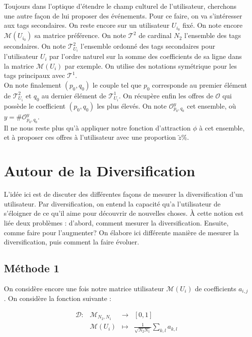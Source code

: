 \documentclass[11pt, oneside]{article}
\begin{document}
Toujours dans l'optique d'étendre le champ culturel de l'utilisateur, cherchons une autre façon de lui proposer des événements. Pour ce faire, on va s'intéresser aux tags secondaires. On reste encore sur un utilisateur $U_{i_0}$ fixé. On note encore $\mathcal{M} (U_{i_0})$ sa matrice préférence. On note $\mathcal{T}^2$ de cardinal $N_2$ l'ensemble des tags secondaires. On note $\mathcal{T}^2_{U_i}$ l'ensemble ordonné des tags secondaires pour l'utilisateur $U_i$ par l'ordre naturel sur la somme des coefficients de sa ligne dans la matrice $\mathcal{M} (U_{i})$ par exemple. On utilise des notations symétrique pour les tags principaux avec $\mathcal{T}^1$. \\
On note finalement $(p_0,q_0)$ le couple tel que $p_0$ corresponde au premier élément de $\mathcal{T}^2_{U_i}$ et $q_0$ au dernier élément de $\mathcal{T}^1_{U_i}$. On récupère enfin les offres de $\mathcal{O}$ qui possède le coefficient $(p_0,q_0)$ les plus élevés. On note $\mathcal{O}_{p_0,q_0}^y$ cet ensemble, où $y = \# \mathcal{O}_{p_0,q_0}^y$. \\

Il ne nous reste plus qu'à appliquer notre fonction d'attraction $\phi$ à cet ensemble, et à proposer ces offres à l'utilisateur avec une proportion $\tilde{z} \%$.

\section{Autour de la Diversification}

L'idée ici est de discuter des différentes façons de mesurer la diversification d'un utilisateur. Par diversification, on entend la capacité qu'a l'utilisateur de s'éloigner de ce qu'il aime pour découvrir de nouvelles choses. À cette notion est liée deux problèmes : d'abord, comment mesurer la diversification. Ensuite, comme faire pour l'augmenter? On élabore ici différente manière de mesurer la diversification, puis comment la faire évoluer. 

\subsection{Méthode 1} 

On considère encore une fois notre matrice utilisateur $\mathcal{M} (U_i)$ de coefficients $a_{i,j}$. On considère la fonction suivante : 

\begin{center}
\[
\begin{array}{l|rcl}
\mathcal{D} : &  \mathcal{M}_{N_2,N_1} & \longrightarrow & [0,1] \\
    & \mathcal{M} (U_i) & \longmapsto & \frac{1}{\sqrt{N_2 N_1}} \displaystyle \sum _{k,l} a_{k,l}
    \end{array}
\]

\end{center}
\end{document}
